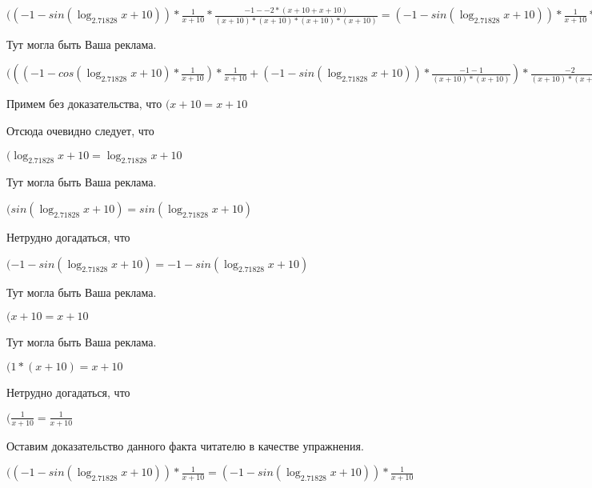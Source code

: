 \documentclass[12pt,a4paper,fleqn]{article}
\theoremstyle{definition}
\begin{document}
$(( -1  - sin(\log_{ 2.71828 }{ x  +  10 })) * \frac{ 1 }{ x  +  10 }
 * \frac{ -1  -  -2  * ( x  +  10  +  x  +  10 )}{( x  +  10 ) * ( x  +  10 ) * ( x  +  10 ) * ( x  +  10 )}
 = ( -1  - sin(\log_{ 2.71828 }{ x  +  10 })) * \frac{ 1 }{ x  +  10 }
 * \frac{ -1  -  -2  * ( x  +  10  +  x  +  10 )}{( x  +  10 ) * ( x  +  10 ) * ( x  +  10 ) * ( x  +  10 )}
$

Тут могла быть Ваша реклама.

$((( -1  - cos(\log_{ 2.71828 }{ x  +  10 }) * \frac{ 1 }{ x  +  10 }
) * \frac{ 1 }{ x  +  10 }
 + ( -1  - sin(\log_{ 2.71828 }{ x  +  10 })) * \frac{ -1  -  1 }{( x  +  10 ) * ( x  +  10 )}
) * \frac{ -2 }{( x  +  10 ) * ( x  +  10 )}
 + ( -1  - sin(\log_{ 2.71828 }{ x  +  10 })) * \frac{ 1 }{ x  +  10 }
 * \frac{ -1  -  -2  * ( x  +  10  +  x  +  10 )}{( x  +  10 ) * ( x  +  10 ) * ( x  +  10 ) * ( x  +  10 )}
 = (( -1  - cos(\log_{ 2.71828 }{ x  +  10 }) * \frac{ 1 }{ x  +  10 }
) * \frac{ 1 }{ x  +  10 }
 + ( -1  - sin(\log_{ 2.71828 }{ x  +  10 })) * \frac{ -1  -  1 }{( x  +  10 ) * ( x  +  10 )}
) * \frac{ -2 }{( x  +  10 ) * ( x  +  10 )}
 + ( -1  - sin(\log_{ 2.71828 }{ x  +  10 })) * \frac{ 1 }{ x  +  10 }
 * \frac{ -1  -  -2  * ( x  +  10  +  x  +  10 )}{( x  +  10 ) * ( x  +  10 ) * ( x  +  10 ) * ( x  +  10 )}
$

Примем без доказательства, что
$( x  +  10  =  x  +  10 $

Отсюда очевидно следует, что

$(\log_{ 2.71828 }{ x  +  10 } = \log_{ 2.71828 }{ x  +  10 }$

Тут могла быть Ваша реклама.

$(sin(\log_{ 2.71828 }{ x  +  10 }) = sin(\log_{ 2.71828 }{ x  +  10 })$

Нетрудно догадаться, что

$( -1  - sin(\log_{ 2.71828 }{ x  +  10 }) =  -1  - sin(\log_{ 2.71828 }{ x  +  10 })$

Тут могла быть Ваша реклама.

$( x  +  10  =  x  +  10 $

Тут могла быть Ваша реклама.

$( 1  * ( x  +  10 ) =  x  +  10 $

Нетрудно догадаться, что

$(\frac{ 1 }{ x  +  10 }
 = \frac{ 1 }{ x  +  10 }
$

Оставим доказательство данного факта читателю в качестве упражнения.

$(( -1  - sin(\log_{ 2.71828 }{ x  +  10 })) * \frac{ 1 }{ x  +  10 }
 = ( -1  - sin(\log_{ 2.71828 }{ x  +  10 })) * \frac{ 1 }{ x  +  10 }
$
\end{document}
